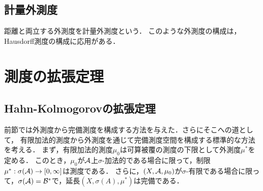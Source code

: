 \documentclass[uplatex, dvipdfmx]{jsreport}
\renewcommand{\B}{\mathcal{B}}
\begin{document}
\subsection{計量外測度}

\begin{tcolorbox}[colframe=ForestGreen, colback=ForestGreen!10!white,breakable,colbacktitle=ForestGreen!40!white,coltitle=black,fonttitle=\bfseries\sffamily,
title=]
    距離と両立する外測度を計量外測度という．
    このような外測度の構成は，Hausdorff測度の構成に応用がある．
\end{tcolorbox}

\section{測度の拡張定理}

\subsection{Hahn-Kolmogorovの拡張定理}

\begin{tcolorbox}[colframe=ForestGreen, colback=ForestGreen!10!white,breakable,colbacktitle=ForestGreen!40!white,coltitle=black,fonttitle=\bfseries\sffamily,
title=Hahn-Kolmogorovの拡張定理]
    前節では外測度から完備測度を構成する方法を与えた．さらにそこへの道として，
    有限加法的測度から外測度を通じて完備測度空間を構成する標準的な方法を考える．
    まず，有限加法的測度$\mu_0$は可算被覆の測度の下限として外測度$\mu^*$を定める．
    このとき，$\mu_0$が$\mathcal{A}$上$\sigma$-加法的である場合に限って，制限$\mu^*:\sigma(\mathcal{A})\to[0,\infty]$は測度である．
    さらに，$(X,\mathcal{A},\mu_0)$が$\sigma$-有限である場合に限って，$\sigma(\A)=\B^*$で，延長$(X,\sigma(A),\mu^*)$は完備である．
\end{tcolorbox}
\end{document}
